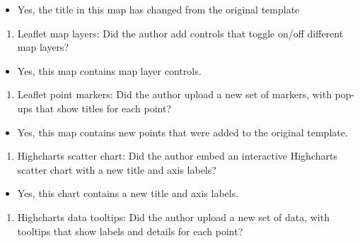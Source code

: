 \documentclass[
  english,
]{book}
\providecommand{\tightlist}{%
  \setlength{\itemsep}{0pt}\setlength{\parskip}{0pt}}
\begin{document}
\begin{itemize}
\tightlist
\item
  Yes, the title in this map has changed from the original template
\end{itemize}

\begin{enumerate}
\def\labelenumi{\arabic{enumi}.}
\setcounter{enumi}{1}
\tightlist
\item
  Leaflet map layers: Did the author add controls that toggle on/off different map layers?
\end{enumerate}

\begin{itemize}
\tightlist
\item
  Yes, this map contains map layer controls.
\end{itemize}

\begin{enumerate}
\def\labelenumi{\arabic{enumi}.}
\setcounter{enumi}{2}
\tightlist
\item
  Leaflet point markers: Did the author upload a new set of markers, with pop-ups that show titles for each point?
\end{enumerate}

\begin{itemize}
\tightlist
\item
  Yes, this map contains new points that were added to the original template.
\end{itemize}

\begin{enumerate}
\def\labelenumi{\arabic{enumi}.}
\setcounter{enumi}{3}
\tightlist
\item
  Highcharts scatter chart: Did the author embed an interactive Highcharts scatter chart with a new title and axis labels?
\end{enumerate}

\begin{itemize}
\tightlist
\item
  Yes, this chart contains a new title and axis labels.
\end{itemize}

\begin{enumerate}
\def\labelenumi{\arabic{enumi}.}
\setcounter{enumi}{4}
\tightlist
\item
  Highcharts data tooltips: Did the author upload a new set of data, with tooltips that show labels and details for each point?
\end{enumerate}
\end{document}
